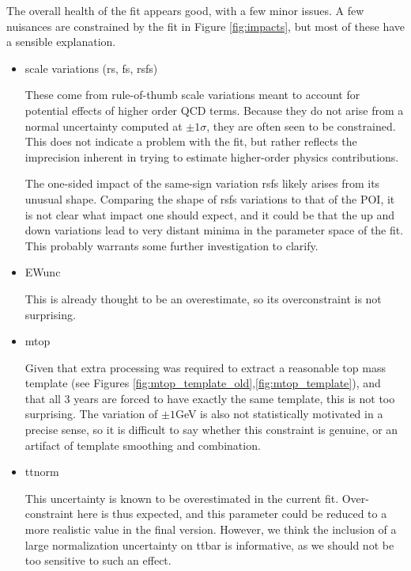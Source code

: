 The overall health of the fit appears good, with a few minor issues. A few nuisances are constrained by the fit in Figure \ref{fig:impacts}, but most of these have a sensible explanation. 
\begin{itemize}
    \item scale variations (rs, fs, rsfs)
    
    These come from rule-of-thumb scale variations meant to account for potential effects of higher order QCD terms. Because they do not arise from a normal uncertainty computed at $\pm 1 \sigma$, they are often seen to be constrained. This does not indicate a problem with the fit, but rather reflects the imprecision inherent in trying to estimate higher-order physics contributions.
    
    The one-sided impact of the same-sign variation rsfs likely arises from its unusual shape. Comparing the shape of rsfs variations to that of the POI, it is not clear what impact one should expect, and it could be that the up and down variations lead to very distant minima in the parameter space of the fit. This probably warrants some further investigation to clarify.
    
    \item EWunc
    
    This is already thought to be an overestimate, so its overconstraint is not surprising. 
    
    \item mtop
    
    Given that extra processing was required to extract a reasonable top mass template (see Figures \ref{fig:mtop_template_old},\ref{fig:mtop_template}), and that all 3 years are forced to have exactly the same template, this is not too surprising. The variation of $\pm 1$GeV is also not statistically motivated in a precise sense, so it is difficult to say whether this constraint is genuine, or an artifact of template smoothing and combination. 
    
    \item ttnorm
    
    This uncertainty is known to be overestimated in the current fit. Over-constraint here is thus expected, and this parameter could be reduced to a more realistic value in the final version. However, we think the inclusion of a large normalization uncertainty on ttbar is informative, as we should not be too sensitive to such an effect.
    

\end{itemize}

